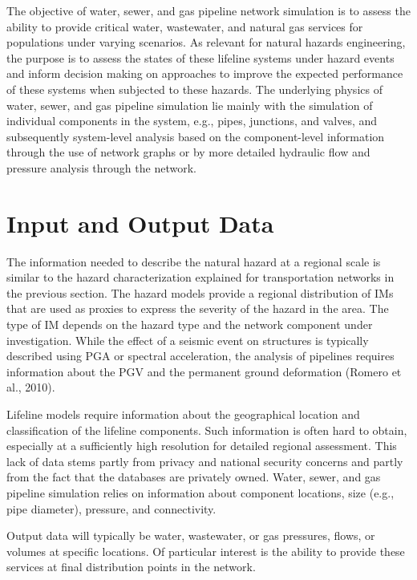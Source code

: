 The objective of water, sewer, and gas pipeline network simulation is to assess the ability to provide critical water, wastewater, and natural gas services for populations under varying scenarios. As relevant for natural hazards engineering, the purpose is to assess the states of these lifeline systems under hazard events and inform decision making on approaches to improve the expected performance of these systems when subjected to these hazards. The underlying physics of water, sewer, and gas pipeline simulation lie mainly with the simulation of individual components in the system, e.g., pipes, junctions, and valves, and subsequently system-level analysis based on the component-level information through the use of network graphs or by more detailed hydraulic flow and pressure analysis through the network.
 
\section{Input and Output Data}
\label{sec:perf_pipeline_io}

The information needed to describe the natural hazard at a regional scale is similar to the hazard characterization explained for transportation networks in the previous section. The hazard models provide a regional distribution of IMs that are used as proxies to express the severity of the hazard in the area. The type of IM depends on the hazard type and the network component under investigation. While the effect of a seismic event on structures is typically described using PGA or spectral acceleration, the analysis of pipelines requires information about the PGV and the permanent ground deformation (Romero et al., 2010).

Lifeline models require information about the geographical location and classification of the lifeline components. Such information is often hard to obtain, especially at a sufficiently high resolution for detailed regional assessment. This lack of data stems partly from privacy and national security concerns and partly from the fact that the databases are privately owned. Water, sewer, and gas pipeline simulation relies on information about component locations, size (e.g., pipe diameter), pressure, and connectivity. 

Output data will typically be water, wastewater, or gas pressures, flows, or volumes at specific locations. Of particular interest is the ability to provide these services at final distribution points in the network.

